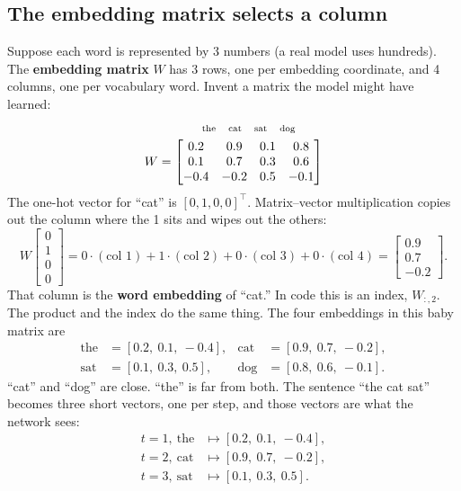 \documentclass[11pt]{article}
\begin{document}
\subsection{The embedding matrix selects a column}

Suppose each word is represented by 3 numbers (a real model uses hundreds).
The \textbf{embedding matrix} \(W\) has 3 rows, one per embedding
coordinate, and 4 columns, one per vocabulary word. Invent a matrix the
model might have learned:
\[
\begin{array}{c@{\;}c}
 &
 \begin{array}{cccc}
 \scriptstyle\text{the} & \scriptstyle\text{cat} &
 \scriptstyle\text{sat} & \scriptstyle\text{dog}
 \end{array}
 \\[0.3em]
W =
 &
\begin{bmatrix}
0.2 & 0.9 & 0.1 & 0.8 \\
0.1 & 0.7 & 0.3 & 0.6 \\
-0.4 & -0.2 & 0.5 & -0.1
\end{bmatrix}
\end{array}
\]
The one-hot vector for ``cat'' is \([0,1,0,0]^\top\). Matrix--vector
multiplication copies out the column where the 1 sits and wipes out the
others:
\[
W
\begin{bmatrix}0\\1\\0\\0\end{bmatrix}
=
0\cdot(\text{col 1})
+1\cdot(\text{col 2})
+0\cdot(\text{col 3})
+0\cdot(\text{col 4})
=
\begin{bmatrix}0.9\\0.7\\-0.2\end{bmatrix}.
\]
That column is the \textbf{word embedding} of ``cat.'' In code this is an
index, \(W_{:,2}\). The product and the index do the same thing. The four
embeddings in this baby matrix are
\begin{align*}
\text{the}&=[0.2,\ 0.1,\ -0.4], &
\text{cat}&=[0.9,\ 0.7,\ -0.2], \\
\text{sat}&=[0.1,\ 0.3,\ 0.5], &
\text{dog}&=[0.8,\ 0.6,\ -0.1].
\end{align*}
``cat'' and ``dog'' are close. ``the'' is far from both. The sentence
``the cat sat'' becomes three short vectors, one per step, and those
vectors are what the network sees:
\begin{align*}
t=1,\ \text{the} &\mapsto [0.2,\ 0.1,\ -0.4], \\
t=2,\ \text{cat} &\mapsto [0.9,\ 0.7,\ -0.2], \\
t=3,\ \text{sat} &\mapsto [0.1,\ 0.3,\ 0.5].
\end{align*}
\end{document}
